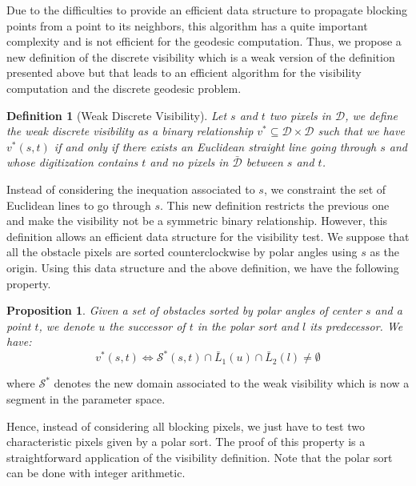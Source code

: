 \documentclass[fleqn,twoside]{article}
\newtheorem{defi}{Definition}
\newtheorem{prop}{Proposition}
\begin{document}
Due  to  the difficulties to  provide an  efficient data  structure to
propagate  blocking   points  from a  point  to   its neighbors,  this
algorithm has a  quite important complexity  and is not efficient  for
the geodesic  computation.  Thus, we propose a   new definition of the
discrete    visibility  which is  a weak   version   of the definition
presented above  but  that leads  to an   efficient algorithm for  the
visibility computation and the discrete geodesic problem.

\begin{defi}[Weak Discrete Visibility]
Let $s$ and $t$ two pixels in $\mathcal{D}$, we define the weak
discrete visibility as a binary relationship $v^* \subseteq \mathcal{D}\times\mathcal{D}$ such that we have $v^*(s,t)$ if and only if 
 there exists an Euclidean straight line going through $s$ and whose digitization contains $t$ 
and no pixels in $\bar{\mathcal{D}}$ between $s$ and $t$.
\end{defi}


Instead of considering the inequation associated to $s$, we constraint
the set  of Euclidean lines to go   through $s$.  This  new definition
restricts the previous one and make the visibility  not be a symmetric
binary relationship. However, this definition allows an efficient data
structure for the visibility test.  We  suppose that all the  obstacle
pixels are sorted counterclockwise by  polar angles  using $s$ as  the
origin. Using  this data structure and  the  above definition, we have
the following property.


\begin{prop}
Given  a set of obstacles  sorted by polar angles  of center $s$ and a
point $t$, we denote $u$ the successor of $t$ in the polar sort and $l$ its
predecessor. We have:
\begin{equation}
  v^*(s,t) \Leftrightarrow \mathcal{S}^*(s,t) \cap \bar{L}_1(u) \cap \bar{L}_2(l) \neq \emptyset
\end{equation}
\end{prop}

where  $\mathcal{S}^*$ denotes the new domain   associated to the weak
visibility which is now a segment in the parameter space.

Hence, instead of  considering all  blocking pixels,  we just  have to
test  two characteristic pixels  given by  a  polar sort. The proof of
this  property is  a   straightforward application of the   visibility
definition.   Note that the   polar  sort can   be  done with  integer
arithmetic.
\end{document}
